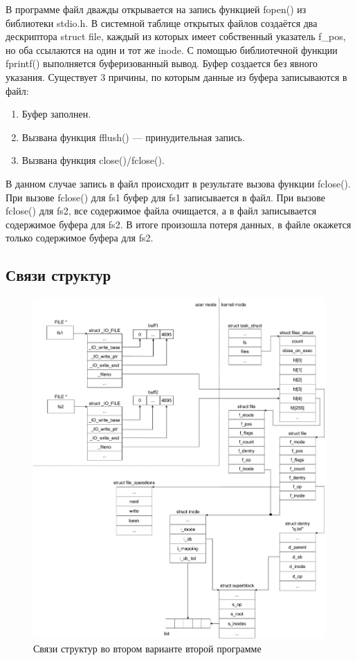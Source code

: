 В программе файл дважды открывается на запись функцией fopen() из библиотеки stdio.h. В системной таблице открытых файлов создаётся два дескриптора struct file, каждый из которых имеет собственный указатель f\_pos, но оба ссылаются на один и тот же inode. С помощью библиотечной функции fprintf() выполняется буферизованный вывод. Буфер создается без явного указания. Существует 3 причины, по которым данные из буфера записываются в файл:

\begin{enumerate}[label*=\arabic*.]
	\item Буфер заполнен.
	\item Вызвана функция fflush() --- принудительная запись.
	\item Вызвана функция close()/fclose().
\end{enumerate}

В данном случае запись в файл происходит в результате вызова функции fclose(). При вызове fclose() для fs1 буфер для fs1 записывается в файл. При вызове fclose() для fs2, все содержимое файла очищается, а в файл записывается содержимое буфера для fs2. В итоге произошла потеря данных, в файле окажется только содержимое буфера для fs2.



\newpage
\subsection{Связи структур}
\begin{figure}[!h]
	\centering
	\includegraphics[width=\textwidth]{image/d3}
	\caption{Связи структур во втором варианте второй программе}
\end{figure}

